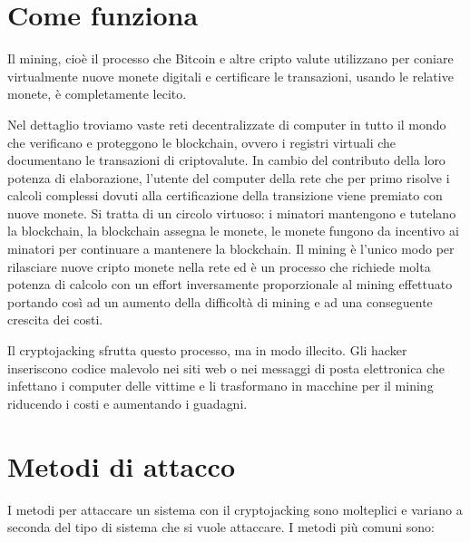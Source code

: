 \documentclass[12pt,a4paper]{article}
\begin{document}
\newpage

\section{Come funziona}
Il mining, cioè il processo che Bitcoin e altre cripto valute utilizzano per
coniare virtualmente nuove monete digitali e certificare le transazioni, usando
le relative monete, è completamente lecito. 

Nel dettaglio troviamo vaste reti decentralizzate di computer in tutto il mondo
che verificano e proteggono le blockchain, ovvero i registri virtuali che
documentano le transazioni di criptovalute. In cambio del contributo della loro
potenza di elaborazione, l'utente del computer della rete che per primo risolve
i calcoli complessi dovuti alla certificazione della transizione viene premiato
con nuove monete. Si tratta di un circolo virtuoso: i minatori mantengono e
tutelano la blockchain, la blockchain assegna le monete, le monete fungono da
incentivo ai minatori per continuare a mantenere la blockchain. Il mining è
l'unico modo per rilasciare nuove cripto monete nella rete ed è un processo che
richiede molta potenza di calcolo con un effort inversamente proporzionale al
mining effettuato portando così ad un aumento della difficoltà di mining e ad
una conseguente crescita dei costi.

Il cryptojacking sfrutta questo processo, ma in modo illecito. Gli hacker
inseriscono codice malevolo nei siti web o nei messaggi di posta elettronica che
infettano i computer delle vittime e li trasformano in macchine per il mining
riducendo i costi e aumentando i guadagni.

\newpage

\section{Metodi di attacco}
I metodi per attaccare un sistema con il cryptojacking sono molteplici e variano
a seconda del tipo di sistema che si vuole attaccare. I metodi più comuni sono:
\end{document}
